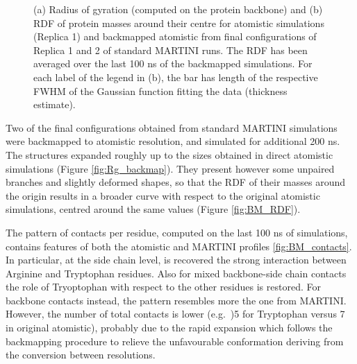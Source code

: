 \begin{figure}[t!]
\centering
{}
\caption[Backmapping simulations: R$_g$ and RDF]{(a) Radius of gyration (computed on the protein backbone) and (b) RDF of protein masses around their centre for atomistic simulations (Replica 1) and backmapped atomistic from final configurations of Replica 1 and 2 of standard MARTINI runs. The RDF has been averaged over the last 100 ns of the backmapped simulations. For each label of the legend in (b), the bar has length of the respective FWHM of the Gaussian function fitting the data (thickness estimate). }
\label{fig:backmap}
\end{figure}
Two of the final configurations obtained from standard MARTINI simulations were backmapped to atomistic resolution, and simulated for additional 200 ns. The structures expanded roughly up to the sizes obtained in direct atomistic simulations (Figure \ref{fig:Rg_backmap}). They present however some unpaired branches and slightly deformed shapes, so that the RDF of their masses around the origin results in a broader curve with respect to the original atomistic simulations, centred around the same values (Figure \ref{fig:BM_RDF}).

The pattern of contacts per residue, computed on the last 100 ns of simulations, contains features of both the atomistic and MARTINI profiles \ref{fig:BM_contacts}.
%
In particular, at the side chain level, is recovered the strong interaction between Arginine and Tryptophan residues. Also for mixed backbone-side chain contacts the role of Tryoptophan with respect to the other residues is restored. For backbone contacts instead, the pattern resembles more the one from MARTINI. However, the number of total contacts is lower (e.g.\ )5 for Tryptophan versus 7 in original atomistic), probably due to the rapid expansion which follows the backmapping procedure to relieve the unfavourable conformation deriving from the conversion between resolutions.

